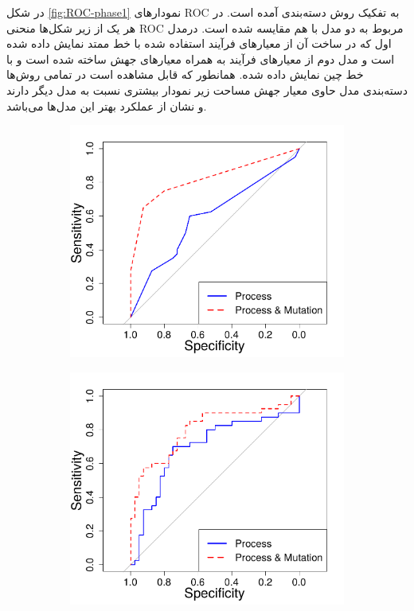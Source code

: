 در شکل \ref{fig:ROC-phase1} نمودارهای ROC به تفکیک روش دسته‌بندی آمده است. در هر یک از زیر شکل‌ها منحنی ROC مربوط به  دو مدل با هم مقایسه شده است. درمدل اول که در ساخت آن از معیارهای فرآیند استفاده شده  با خط ممتد نمایش داده شده است و مدل دوم  از معیارهای فرآیند به همراه معیارهای جهش ساخته شده‌ است  و با خط چین نمایش داده شده‌. همانطور که قابل مشاهده است در تمامی روش‌ها دسته‌بندی مدل‌ حاوی معیار جهش مساحت زیر نمودار بیشتری نسبت به مدل دیگر دارند و نشان از عملکرد بهتر این مدل‌ها می‌باشد. 
\begin{figure}[H]
	\begin{subfigure}{.5\textwidth}
		\centering
		\includegraphics[width=\linewidth]{img/evaluation/phase1-roc-dt.pdf}
		\caption{}
	\end{subfigure}
	\begin{subfigure}{.5\textwidth}
	\centering
	\includegraphics[width=\linewidth]{img/evaluation/phase1-roc-svm.pdf}

\end{subfigure}
\end{figure}
